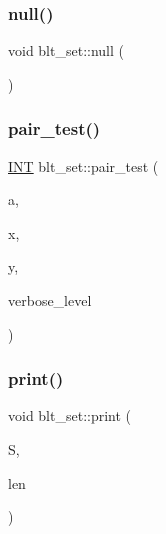 \mbox{\label{classblt__set_a2345145a41264dca01b4bcc40dfe54d4}} 
\subsubsection{\texorpdfstring{null()}{null()}}
{\footnotesize\ttfamily void blt\+\_\+set\+::null (\begin{DoxyParamCaption}{ }\end{DoxyParamCaption})}

\mbox{\label{classblt__set_a010e746fd6fc5a539cec27bced4ff477}} 
\subsubsection{\texorpdfstring{pair\+\_\+test()}{pair\_test()}}
{\footnotesize\ttfamily \mbox{\hyperlink{galois_8h_a09fddde158a3a20bd2dcadb609de11dc}{I\+NT}} blt\+\_\+set\+::pair\+\_\+test (\begin{DoxyParamCaption}\item[{\mbox{\hyperlink{galois_8h_a09fddde158a3a20bd2dcadb609de11dc}{I\+NT}}}]{a,  }\item[{\mbox{\hyperlink{galois_8h_a09fddde158a3a20bd2dcadb609de11dc}{I\+NT}}}]{x,  }\item[{\mbox{\hyperlink{galois_8h_a09fddde158a3a20bd2dcadb609de11dc}{I\+NT}}}]{y,  }\item[{\mbox{\hyperlink{galois_8h_a09fddde158a3a20bd2dcadb609de11dc}{I\+NT}}}]{verbose\+\_\+level }\end{DoxyParamCaption})}

\mbox{\label{classblt__set_a9d3e3ea3bb297022cc23c02d4233bb8b}} 
\subsubsection{\texorpdfstring{print()}{print()}}
{\footnotesize\ttfamily void blt\+\_\+set\+::print (\begin{DoxyParamCaption}\item[{\mbox{\hyperlink{galois_8h_a09fddde158a3a20bd2dcadb609de11dc}{I\+NT}} $\ast$}]{S,  }\item[{\mbox{\hyperlink{galois_8h_a09fddde158a3a20bd2dcadb609de11dc}{I\+NT}}}]{len }\end{DoxyParamCaption})}

